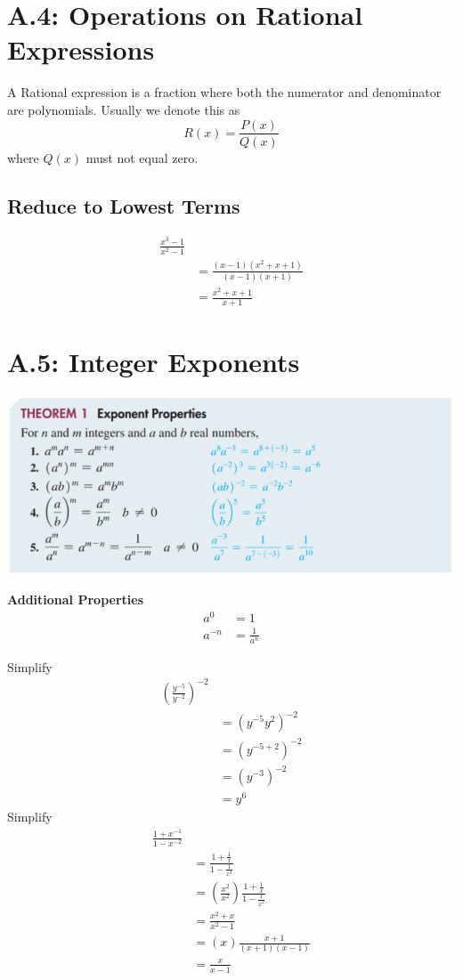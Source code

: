 \documentclass[14pt]{extarticle}
\begin{document}
\section{A.4: Operations on Rational Expressions}
A Rational expression is a fraction where both the numerator and denominator are polynomials. Usually we denote this as $$R(x) = \frac{P(x)}{Q(x)}$$ where $Q(x)$ must not equal zero.

\subsection{Reduce to Lowest Terms}
\begin{align*}
	\frac{x^3-1}{x^2-1} & \\
	&= \frac{(x-1)(x^2 +x +1)}{(x-1)(x+1)} \\
	& = \frac{x^2 +x +1}{x+1}
\end{align*}

\section{A.5: Integer Exponents}
\begin{center}
	\includegraphics[width=1\linewidth]{a-5-1}
\end{center}
\begin{tcolorbox}[enhanced jigsaw,colback=bg,boxrule=0pt,arc=0pt]
	\textbf{Additional Properties}
	\begin{align*}
		a^0 &= 1 \\
		a^{-n} &= \frac{1}{a^n} 
	\end{align*}
\end{tcolorbox}
Simplify
\begin{align*}
	\left(\frac{y^{-5}}{y^{-2}}\right)^{-2} & \\
	&= \left(y^{-5}y^2\right)^{-2} \\
	&= \left(y^{-5+2}\right)^{-2} \\
	&= (y^{-3})^{-2} \\
	&= y^6
\end{align*}
Simplify
\begin{align*}
	\frac{1+x^{-1}}{1-x^{-2}} & \\
	&= \frac{1+ \frac{1}{x}}{1 - \frac{1}{x^2}} \\
	&= \left(\frac{x^2}{x^2}\right)\frac{1+ \frac{1}{x}}{1 - \frac{1}{x^2}} \\
	&= \frac{x^2 + x}{x^2 -1} \\
	&= \left(x\right)\frac{x+1}{(x+1)(x-1)} \\
	&= \frac{x}{x-1}
\end{align*}
\end{document}
